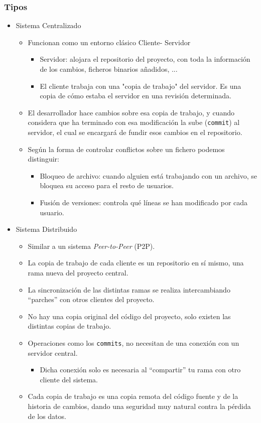\subsubsection{Tipos}
\begin{itemize}
	\item Sistema Centralizado
	\begin{itemize}
		\item Funcionan como un entorno clásico Cliente- Servidor
		\begin{itemize}[label=$\to$]
			\item Servidor: alojara el repositorio del proyecto, con toda la información de los cambios, ficheros binarios añadidos, ...
			\item  El cliente trabaja con una "copia de trabajo" del servidor. Es una copia de cómo estaba el servidor en una revisión determinada.
		\end{itemize}
		\item El desarrollador hace cambios sobre esa copia de trabajo, y cuando considera que ha terminado con esa modificación la sube (\texttt{commit}) al servidor, el cual se encargará de fundir esos cambios en el repositorio.
		\item Según la forma de controlar conflictos sobre un fichero podemos distinguir:
		\begin{itemize}[label=$\to$]
			\item Bloqueo de archivo: cuando alguien está trabajando con un archivo, se bloquea su acceso para el resto de usuarios.
			\item Fusión de versiones: controla qué líneas se han modificado por cada usuario.
		\end{itemize}
	\end{itemize}
	\item Sistema Distribuido
	\begin{itemize}
		\item Similar a un sistema \textit{Peer-to-Peer} (P2P).
		\item La copia de trabajo de cada cliente es un repositorio en sí mismo, una rama nueva del proyecto central.
		\item La sincronización de las distintas ramas se realiza intercambiando “parches” con otros clientes del proyecto.
		\item No hay una copia original del código del proyecto, solo existen las distintas copias de trabajo.
		\item Operaciones como los \texttt{commits}, no necesitan de una conexión con un servidor central.
		\begin{itemize}[label=$\to$]
			\item Dicha conexión solo es necesaria al “compartir” tu rama con otro cliente del sistema.
		\end{itemize}
		\item Cada copia de trabajo es una copia remota del código fuente y de la historia de cambios, dando una seguridad muy natural contra la pérdida de los datos.
	\end{itemize}
\end{itemize}
